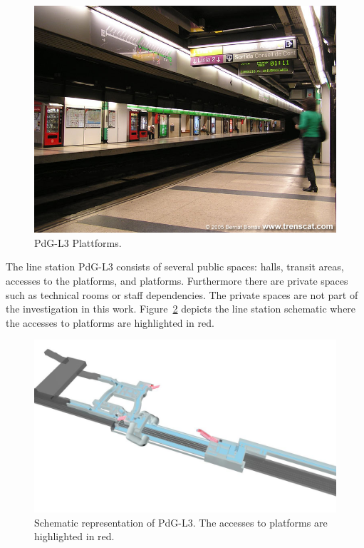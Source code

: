 \begin{figure}[htb]
  \centering
  \includegraphics[width=\linewidth]{PdG-L3_platforms.jpg} 
  \caption{PdG-L3 Plattforms. \cite{TMB}}
  \label{fig:PdG-L3_platforms}
\end{figure}

The line station PdG-L3 consists of several public spaces: halls, transit areas, accesses to the platforms, and platforms. Furthermore there are private spaces such as technical rooms or staff dependencies. The private spaces are not part of the investigation in this work. Figure~\ref{fig:PdG-L3_schematic} depicts the line station schematic where the accesses to platforms are highlighted in red.

\begin{figure}[htb]
  \centering
  \includegraphics[width=\linewidth]{PdG-L3_schematic.jpg} 
  \caption{Schematic representation of PdG-L3. The accesses to platforms are highlighted in red. \cite{TMB}}
  \label{fig:PdG-L3_schematic}
\end{figure}

